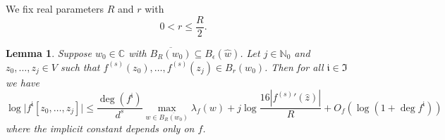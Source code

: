 \documentclass[12pt,oneside,a4]{amsart}
\newcommand{\IC}{\mathbb{C}}
\newcommand{\IN}{\mathbb{N}}
\newcounter{maincounter}
\numberwithin{maincounter}{section}
\numberwithin{equation}{section}
\newtheorem{lemma}[maincounter]{Lemma}
\renewcommand{\subset}{\subseteq}
\begin{document}
We fix real parameters $R$ and $r$  with
\begin{equation}
  \label{eq:rRhyp}
  0 < r \le \frac R2.
\end{equation}


\begin{lemma}
  \label{lem:ddbound}
  Suppose $w_0\in \IC$ with
  $\overline{B_{R}(w_0)} \subset B_{\epsilon}(\widehat w)$.
  Let $j\in\IN_0$ and $z_0,\ldots,z_j\in V$ such that
  $f^{(s)}(z_0),\ldots,f^{(s)}(z_j) \in B_r(w_0)$.
  Then for all $\mathfrak i \in \mathfrak{I}$ we have
  \begin{equation*}
    \log \bigl|f^{\mathfrak{i}}[z_0,\ldots,z_j]\bigr|\le
    \frac{\deg(f^{\mathfrak{i}})}{d^s}    \max_{w\in \overline{B_R(w_0)}} \lambda_f(w)
    + j \log\frac{16 |{f^{(s)}}'(\widehat z)|}{R} 
    +O_f(\log(1+\deg
    f^{\mathfrak{i}}))
  \end{equation*}
  where the implicit constant depends only on $f$. 
\end{lemma}
\end{document}
